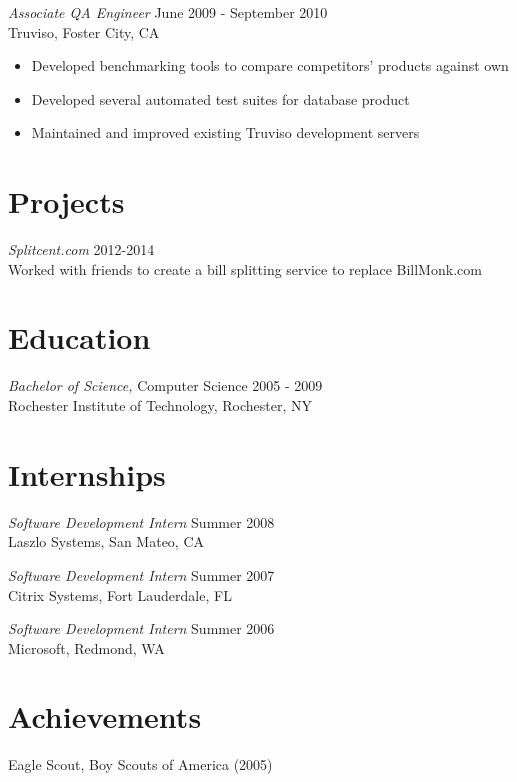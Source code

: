 \documentclass[line,margin]{res}
\begin{document}
\begin{resume}
                {\sl Associate QA Engineer} \hfill June 2009 - September 2010 \\
                Truviso, Foster City, CA
                \begin{itemize}  \itemsep -2pt %
                 \item Developed benchmarking tools to compare competitors' products against own
                 \item Developed several automated test suites for database product
                 \item Maintained and improved existing Truviso development servers
                \end{itemize}
                
\section{Projects}

                {\sl Splitcent.com} \hfill        2012-2014 \\
                Worked with friends to create a bill splitting service to replace BillMonk.com
                
\section{Education} {\sl Bachelor of Science,} Computer Science \hfill    2005 - 2009 \\
                Rochester Institute of Technology, Rochester, NY
                
\section{Internships}
                
                {\sl Software Development Intern} \hfill        Summer 2008 \\
                Laszlo Systems, San Mateo, CA
                
                {\sl Software Development Intern} \hfill        Summer 2007 \\
                Citrix Systems, Fort Lauderdale, FL
                
                {\sl Software Development Intern} \hfill          Summer 2006 \\
                Microsoft, Redmond, WA
           
\section{Achievements}             
            Eagle Scout, Boy Scouts of America (2005) \\
 
\end{resume}
\end{document}
